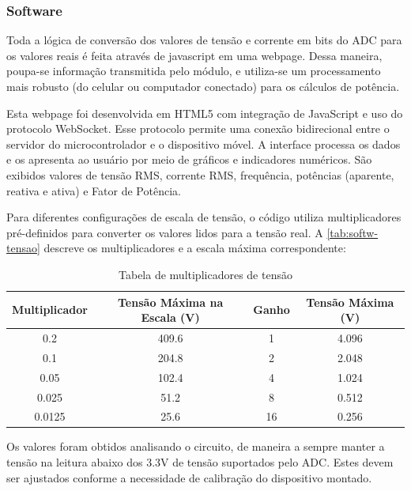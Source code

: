 \subsubsection{Software}\label{softwa}

Toda a lógica de conversão dos valores de tensão e corrente em bits do \gls{ADC} para os valores reais é feita através de javascript em uma webpage. Dessa maneira, poupa-se informação transmitida pelo módulo, e utiliza-se um processamento mais robusto (do celular ou computador conectado) para os cálculos de potência.

Esta webpage foi desenvolvida em HTML5 com integração de JavaScript e uso do protocolo WebSocket. Esse protocolo permite uma conexão bidirecional entre o servidor do microcontrolador e o dispositivo móvel. A interface processa os dados e os apresenta ao usuário por meio de gráficos e indicadores numéricos. São exibidos valores de tensão RMS, corrente RMS, frequência, potências (aparente, reativa e ativa) e Fator de Potência.

Para diferentes configurações de escala de tensão, o código utiliza multiplicadores pré-definidos para converter os valores lidos para a tensão real. A \autoref{tab:softw-tensao} descreve os multiplicadores e a escala máxima correspondente:

\begin{table}[h!]
    \centering
    \caption{Tabela de multiplicadores de tensão}
    \begin{tabular}{ c c c c }
        \hline
        \textbf{Multiplicador} & \textbf{Tensão Máxima na Escala (V)} & \textbf{Ganho} & \textbf{Tensão Máxima (V)} \\
        \hline
        0.2 & 409.6 & 1 & 4.096 \\
        0.1 & 204.8 & 2 & 2.048 \\
        0.05 & 102.4 & 4 & 1.024 \\
        0.025 & 51.2 & 8 & 0.512 \\
        0.0125 & 25.6 & 16 & 0.256 \\
        \hline
    \end{tabular}
    \label{tab:softw-tensao}
    \fonte{}
\end{table}

Os valores foram obtidos analisando o circuito, de maneira a sempre manter a tensão na leitura abaixo dos 3.3V de tensão suportados pelo \gls{ADC}. Estes devem ser ajustados conforme a necessidade de calibração do dispositivo montado.


